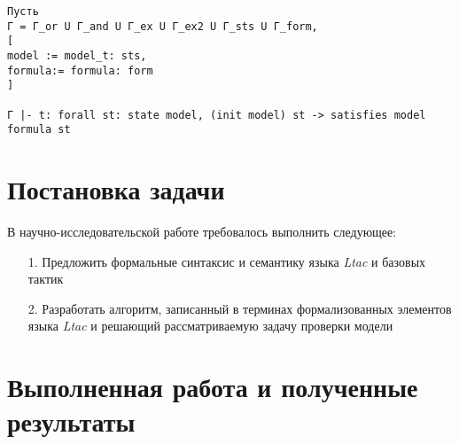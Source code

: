 \documentclass[12pt]{article}
\begin{document}




\begin{verbatim}
Пусть
Г = Г_or U Г_and U Г_ex U Г_ex2 U Г_sts U Г_form,
[
model := model_t: sts,
formula:= formula: form
]

Г |- t: forall st: state model, (init model) st -> satisfies model formula st
\end{verbatim}




\section{Постановка задачи}
В научно-исследовательской работе требовалось выполнить следующее:
\begin{enumerate}
    \item[1.] Предложить формальные синтаксис и семантику языка \textit{Ltac} и базовых тактик
    \item[2.] Разработать алгоритм, записанный в терминах формализованных элементов языка \textit{Ltac} и решающий рассматриваемую задачу проверки модели
\end{enumerate}

  
\clearpage
\section{Выполненная работа и полученные результаты}
\end{document}
